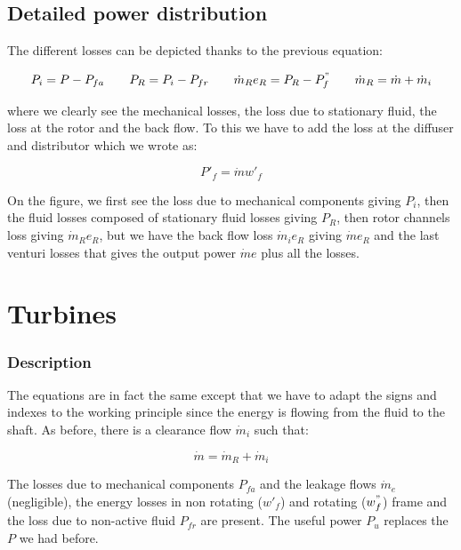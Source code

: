 \subsection{Detailed power distribution}
The different losses can be depicted thanks to the previous equation:

\begin{equation}
P_i = P-P_{fa} \qquad P_R = P_i - P_{fr} \qquad \dot{m}_Re_R = P_R - P^"_{f} \qquad \dot{m}_R = \dot{m} + \dot{m}_i
\end{equation}

where we clearly see the mechanical losses, the loss due to stationary fluid, the loss at the rotor and the back flow. To this we have to add the loss at the diffuser and distributor which we wrote as:

\begin{equation}
P'_f = \dot{m}w'_f
\end{equation}

On the figure, we first see the loss due to mechanical components giving $P_i$, then the fluid losses composed of stationary fluid losses giving $P_R$, then rotor channels loss giving $\dot{m}_Re_R$, but we have the back flow loss $\dot{m}_i e_R$ giving $\dot{m}e_R$ and the last venturi losses that gives the output power $\dot{m}e$ plus all the losses. 

\section{Turbines}
\subsubsection{Description}
The equations are in fact the same except that we have to adapt the signs and indexes to the working principle since the energy is flowing from the fluid to the shaft. As before, there is a clearance flow $\dot{m}_i$ such that: 

\begin{equation}
\dot{m} = \dot{m}_R + \dot{m}_i
\end{equation}

The losses due to mechanical components $P_{fa}$ and the leakage flows $\dot{m}_e$ (negligible), the energy losses in non rotating ($w'_f$) and rotating ($w^"_f$) frame and the loss due to non-active fluid $P_{fr}$ are present. The useful power $P_u$ replaces the $P$ we had before. 

